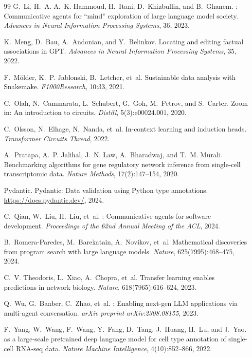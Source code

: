 \documentclass[11pt,a4paper]{article}
\begin{document}
\begin{thebibliography}{99}
G.~Li, H.~A. A.~K. Hammoud, H.~Itani, D.~Khizbullin, and B.~Ghanem.
: Communicative agents for ``mind'' exploration of large language model society.
\newblock \emph{Advances in Neural Information Processing Systems}, 36, 2023.

K.~Meng, D.~Bau, A.~Andonian, and Y.~Belinkov.
\newblock Locating and editing factual associations in {GPT}.
\newblock \emph{Advances in Neural Information Processing Systems}, 35, 2022.

F.~M{\"o}lder, K.~P. Jablonski, B.~Letcher, et~al.
\newblock Sustainable data analysis with {Snakemake}.
\newblock \emph{F1000Research}, 10:33, 2021.

C.~Olah, N.~Cammarata, L.~Schubert, G.~Goh, M.~Petrov, and S.~Carter.
\newblock Zoom in: An introduction to circuits.
\newblock \emph{Distill}, 5(3):e00024.001, 2020.

C.~Olsson, N.~Elhage, N.~Nanda, et~al.
\newblock In-context learning and induction heads.
\newblock \emph{Transformer Circuits Thread}, 2022.

A.~Pratapa, A.~P. Jalihal, J.~N. Law, A.~Bharadwaj, and T.~M. Murali.
\newblock Benchmarking algorithms for gene regulatory network inference from single-cell transcriptomic data.
\newblock \emph{Nature Methods}, 17(2):147--154, 2020.

Pydantic.
\newblock Pydantic: Data validation using {Python} type annotations.
\newblock \url{https://docs.pydantic.dev/}, 2024.

C.~Qian, W.~Liu, H.~Liu, et~al.
: Communicative agents for software development.
\newblock \emph{Proceedings of the 62nd Annual Meeting of the ACL}, 2024.

B.~Romera-Paredes, M.~Barekatain, A.~Novikov, et~al.
\newblock Mathematical discoveries from program search with large language models.
\newblock \emph{Nature}, 625(7995):468--475, 2024.

C.~V. Theodoris, L.~Xiao, A.~Chopra, et~al.
\newblock Transfer learning enables predictions in network biology.
\newblock \emph{Nature}, 618(7965):616--624, 2023.

Q.~Wu, G.~Banber, C.~Zhao, et~al.
: Enabling next-gen {LLM} applications via multi-agent conversation.
\newblock \emph{arXiv preprint arXiv:2308.08155}, 2023.

F.~Yang, W.~Wang, F.~Wang, Y.~Fang, D.~Tang, J.~Huang, H.~Lu, and J.~Yao.
 as a large-scale pretrained deep language model for cell type annotation of single-cell {RNA-seq} data.
\newblock \emph{Nature Machine Intelligence}, 4(10):852--866, 2022.

\end{thebibliography}
\end{document}
